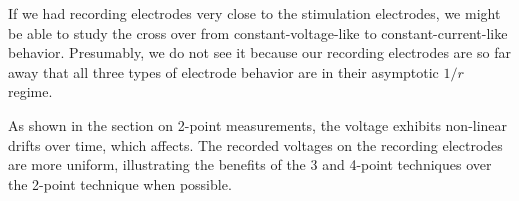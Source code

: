 If we had recording electrodes very close to the stimulation electrodes, we might be able to study the cross over from constant-voltage-like
to constant-current-like behavior. Presumably, we do not see it because our recording electrodes are so far away that all three types of 
electrode behavior are in their asymptotic $1/r$ regime.

As shown in the section on 2-point measurements, the voltage exhibits non-linear drifts over time, which affects. The recorded voltages on the recording electrodes are more uniform, illustrating the benefits of the 3 and 4-point techniques over the 2-point technique when possible. 

%
%
%
%
%
%
